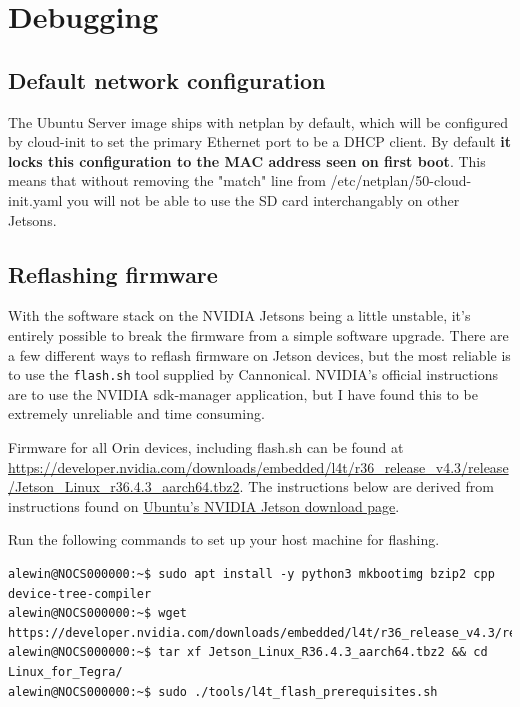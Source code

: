\documentclass[11pt]{article}
\begin{document}
\newpage

\section{Debugging}

\subsection{Default network configuration}
\label{sec:debug-network_config}

The Ubuntu Server image ships with netplan by default, which will be configured by cloud-init to set the primary Ethernet port to be a DHCP client. By default \textbf{it locks this configuration to the MAC address seen on first boot}. This means that without removing the "match" line from /etc/netplan/50-cloud-init.yaml you will not be able to use the SD card interchangably on other Jetsons.

\subsection{Reflashing firmware}
\label{sec:debug-reflash_firmware}

With the software stack on the NVIDIA Jetsons being a little unstable, it's entirely possible to break the firmware from a simple software upgrade. There are a few different ways to reflash firmware on Jetson devices, but the  most reliable is to use the \texttt{flash.sh} tool supplied by Cannonical. NVIDIA's official instructions are to use the NVIDIA sdk-manager application, but I have found this to be extremely unreliable and time consuming.

Firmware for all Orin devices, including flash.sh can be found at \href{https://developer.nvidia.com/downloads/embedded/l4t/r36_release_v4.3/release/Jetson_Linux_r36.4.3_aarch64.tbz2}{https://developer.nvidia.com/downloads/embedded/l4t/r36\_release\_v4.3/release/Jetson\_Linux\_r36.4.3\_aarch64.tbz2}. The instructions below are derived from instructions found on \href{https://ubuntu.com/download/nvidia-jetson}{Ubuntu's NVIDIA Jetson download page}.

Run the following commands to set up your host machine for flashing.

\lstset{style=console}
\begin{lstlisting}
alewin@NOCS000000:~$ sudo apt install -y python3 mkbootimg bzip2 cpp device-tree-compiler
alewin@NOCS000000:~$ wget https://developer.nvidia.com/downloads/embedded/l4t/r36_release_v4.3/release/Jetson_Linux_r36.4.3_aarch64.tbz2
alewin@NOCS000000:~$ tar xf Jetson_Linux_R36.4.3_aarch64.tbz2 && cd Linux_for_Tegra/
alewin@NOCS000000:~$ sudo ./tools/l4t_flash_prerequisites.sh
\end{lstlisting}
\end{document}
